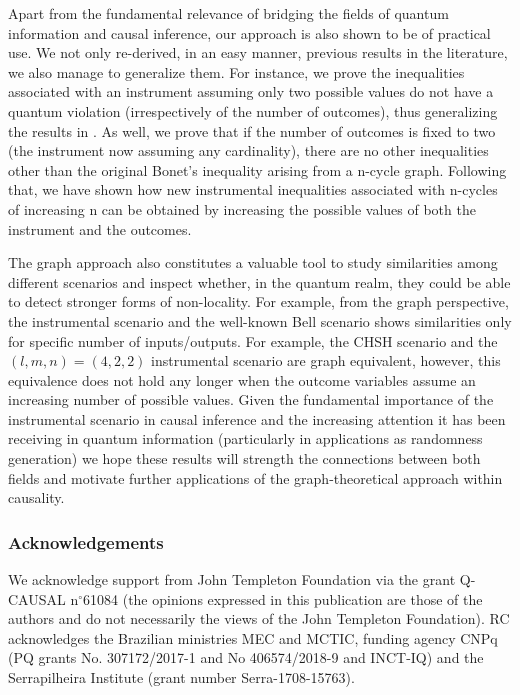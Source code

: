 \documentclass[letterpaper]{article}
\begin{document}
Apart from the fundamental relevance of bridging the fields of quantum
information and causal inference, our approach is also shown to be of practical
use. We not only re-derived, in an easy manner, previous results in the literature,
we also manage to generalize them. For instance, we prove the inequalities
associated with an instrument assuming only two possible values do not have a
quantum violation (irrespectively of the number of outcomes), thus generalizing
the results in \cite{henson2014}. As well, we prove that if the number of
outcomes is fixed to two (the instrument now assuming any cardinality), there are no
other inequalities other than the original Bonet's inequality \cite{bonet2001} arising from a n-cycle graph. Following that, we have shown how new
instrumental inequalities associated with n-cycles of increasing n can be
obtained by increasing the possible values of both the instrument and the
outcomes.

The graph approach also constitutes a valuable tool to study similarities among
different scenarios and inspect whether, in the quantum realm, they could be
able to detect stronger forms of non-locality. For example, from the graph
perspective, the instrumental scenario and the well-known Bell scenario shows
similarities only for specific number of inputs/outputs. For example, the CHSH
scenario \cite{CHSH} and the $(l,m,n)=(4,2,2)$ instrumental scenario are graph
equivalent, however, this equivalence does not hold any longer when the outcome
variables assume an increasing number of possible values. Given the fundamental
importance of the instrumental scenario in causal inference and the increasing
attention it has been receiving in quantum information (particularly in
applications as randomness generation) we hope these results will strength the
connections between both fields and motivate further applications of the
graph-theoretical approach within causality.

\subsubsection*{Acknowledgements}
We acknowledge support from John Templeton Foundation via the grant Q-CAUSAL
n$^{\circ}$61084 (the opinions expressed in this publication are those of the
authors and do not necessarily  the views of the John Templeton
Foundation). RC acknowledges the Brazilian ministries MEC and MCTIC, funding
agency CNPq (PQ grants No. 307172/2017-1 and No 406574/2018-9 and INCT-IQ) and
the Serrapilheira Institute (grant number Serra-1708-15763).
\end{document}
